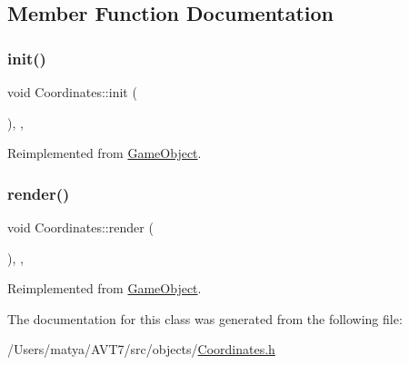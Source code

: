 \subsection{Member Function Documentation}
\mbox{\label{class_coordinates_aaadf934b8f184a9e0abe504e4c2da9b1}} 
\subsubsection{\texorpdfstring{init()}{init()}}
{\footnotesize\ttfamily void Coordinates\+::init (\begin{DoxyParamCaption}{ }\end{DoxyParamCaption})\hspace{0.3cm}{\ttfamily [inline]}, {\ttfamily [override]}, {\ttfamily [virtual]}}



Reimplemented from \hyperlink{class_game_object_aecb2c1b9f69715d854f7604d5d7978ec}{Game\+Object}.

\mbox{\label{class_coordinates_afa2d40b313b3b2933f9030ebfbe31045}} 
\subsubsection{\texorpdfstring{render()}{render()}}
{\footnotesize\ttfamily void Coordinates\+::render (\begin{DoxyParamCaption}{ }\end{DoxyParamCaption})\hspace{0.3cm}{\ttfamily [inline]}, {\ttfamily [override]}, {\ttfamily [virtual]}}



Reimplemented from \hyperlink{class_game_object_a484efb66a7a27c101e84c11d9905d7a6}{Game\+Object}.



The documentation for this class was generated from the following file\+:\begin{DoxyCompactItemize}
\item 
/\+Users/matya/\+A\+V\+T7/src/objects/\hyperlink{_coordinates_8h}{Coordinates.\+h}\end{DoxyCompactItemize}
